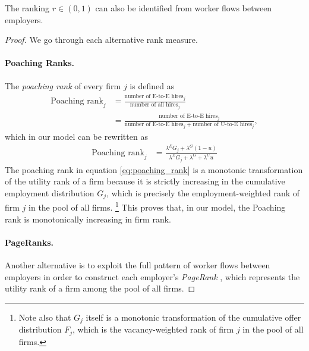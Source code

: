 %
\newcommand{\PropRanksother}{%
    The ranking $r \in (0,1)$ can also be identified from worker flows between employers.%
}
%
\begin{proposition}
    \label{prop:ranks2}
    \PropRanksother
\end{proposition}
%
\begin{proof}

    We go through each alternative rank measure.

    \paragraph{Poaching Ranks.} %
    The \emph{poaching rank} \citep{BaggerLentz2019} of every firm $j$ is defined as
%
    \begin{align}
        \text{Poaching rank}_{j} &= \frac{\text{number of E-to-E hires}_{j}}{\text{number of all hires}_{j}} \\
        &= \frac{\text{number of E-to-E hires}_{j}}{\text{number of E-to-E hires}_{j} + \text{number of U-to-E hires}_{j}},
    \end{align}
    which in our model can be rewritten as
    \begin{align}
        \text{Poaching rank}_{j} &= \frac{\lambda^{E} G_{j} + \lambda^{G} (1-u)}{ \lambda^{E} G_{j} + \lambda^{G} + \lambda^{U} u} \label{eq:poaching_rank}
    \end{align}
    The poaching rank in equation \eqref{eq:poaching_rank} is a monotonic transformation of the utility rank of a firm because it is strictly increasing in the cumulative employment distribution $G_{j}$, which is precisely the employment-weighted rank of firm $j$ in the pool of all firms.%
    \footnote{Note also that $G_{j}$ itself is a monotonic transformation of the cumulative offer distribution $F_{j}$, which is the vacancy-weighted rank of firm $j$ in the pool of all firms.} %
    This proves that, in our model, the Poaching rank is monotonically increasing in firm rank.

    \paragraph{PageRanks.} %
    Another alternative is to exploit the full pattern of worker flows between employers in order to construct each employer's \emph{PageRank} \citep{PageBrinMotwaniWinograd1999, Sorkin2018}, which represents the utility rank of a firm among the pool of all firms.


\end{proof}
